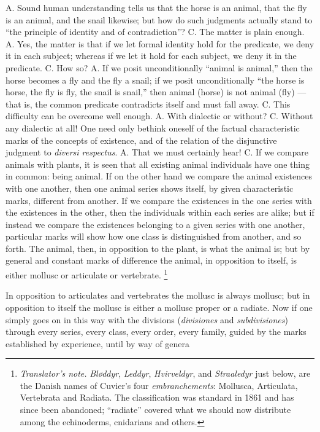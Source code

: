 \documentclass[12pt,a4paper]{book}
\renewcommand{\thefootnote}{\ifcase\value{footnote}\or *)\or **)\or ***)\fi}
\newcommand{\tnote}[1]{%
  \begingroup
  \renewcommand{\thefootnote}{\textdagger}%
  \footnote{\emph{Translator's note.} #1}%
  \addtocounter{footnote}{-1}%
  \endgroup}
\begin{document}
A. Sound human understanding tells us that the horse is an animal, that the fly
is an animal, and the snail likewise; but how do such judgments actually stand
to ``the principle of identity and of contradiction''? C. The matter is plain
enough. A. Yes, the matter is that if we let formal identity hold for the
predicate, we deny it in each subject; whereas if we let it hold for each
subject, we deny it in the predicate. C. How so? A. If we posit
unconditionally ``animal is animal,'' then the horse becomes a fly and the fly
a snail; if we posit unconditionally ``the horse is horse, the fly is fly, the
snail is snail,'' then animal (horse) is not animal (fly) --- that is, the
common predicate contradicts itself and must fall away. C. This difficulty can
be overcome well enough. A. With dialectic or without? C. Without any dialectic
at all! One need only bethink oneself of the factual characteristic marks of
the concepts of existence, and of the relation of the disjunctive judgment to
\textit{diversi respectus}. A. That we must certainly hear! C. If we compare
animals with plants, it is seen that all existing animal individuals have one
thing in common: being animal. If on the other hand we compare the animal
existences with one another, then one animal series shows itself, by given
characteristic marks, different from another. If we compare the existences in
the one series with the existences in the other, then the individuals within
each series are alike; but
if instead we compare the existences belonging to a given series with one
another, particular marks will show how one class is distinguished from
another, and so forth. The animal, then, in opposition to the plant, is what
the animal is; but by general and constant marks of difference the animal, in
opposition to itself, is either mollusc or articulate or vertebrate.\tnote{%
\emph{Bløddyr}, \emph{Leddyr}, \emph{Hvirveldyr}, and \emph{Straaledyr} just
below, are the Danish names of Cuvier's four \textit{embranchements}:
Mollusca, Articulata, Vertebrata and Radiata. The classification was standard
in 1861 and has since been abandoned; ``radiate'' covered what we should now
distribute among the echinoderms, cnidarians and others.} In opposition to
articulates and vertebrates the mollusc is always mollusc; but in opposition to
itself the mollusc is either a mollusc proper or a radiate. Now if one simply
goes on in this way with the divisions (\textit{divisiones} and
\textit{subdivisiones}) through every series, every class, every order, every
family, guided by the marks established by experience, until by way of genera
\end{document}
